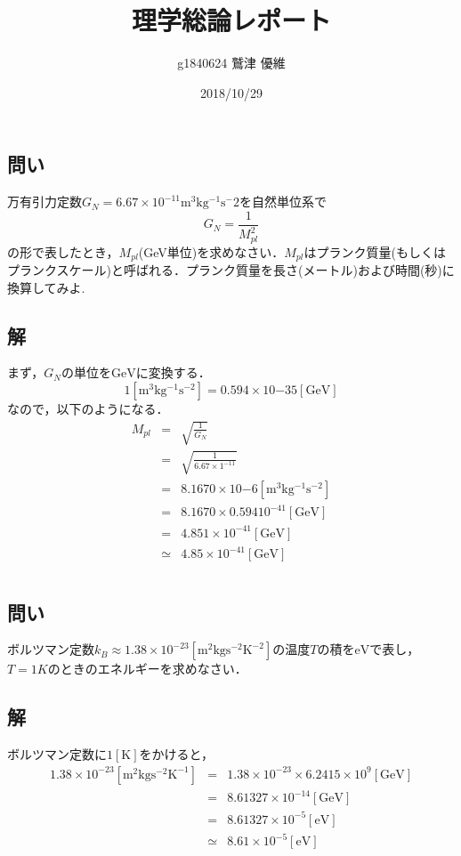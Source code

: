 \documentclass[10pt]{ujarticle}
\title{理学総論レポート}
\author{g1840624 鷲津 優維}
\date{2018/10/29}
\begin{document}
\maketitle
\section{}
\subsection{問い}
万有引力定数$G_N = 6.67×10^{-11} \mathrm{m^3 kg^{-1} s{^-2}}$を自然単位系で
\[
G_N = \frac{1}{M^2_{pl}}
\]
の形で表したとき，$M_{pl}$(GeV単位)を求めなさい．$M_{pl}$はプランク質量(もしくはプランクスケール)と呼ばれる．プランク質量を長さ(メートル)および時間(秒)に換算してみよ.

\subsection{解}
まず，$G_N$の単位を$\mathrm{GeV}$に変換する．
\[
1 \mathrm{[m^3 kg^{-1} s^{-2}]} = 0.594 ×10{-35} \mathrm{[GeV]} 
\]
なので，以下のようになる．
\begin{eqnarray*}
M_{pl} &=& \sqrt{\frac{1}{G_N}} \\
&=& \sqrt{\frac{1}{6.67 × 1^{-11}}} \\
&=& 8.1670 × 10{-6}\mathrm{[m^3 kg^{-1} s^{-2}]} \\
&=& 8.1670 × 0.594  10^{-41} \mathrm{[GeV]} \\
&=& 4.851×10^{-41}\mathrm{[GeV]} \\
&\simeq& 4.85×10^{-41}\mathrm{[GeV]}
\end{eqnarray*}


\section{}
\subsection{問い}
ボルツマン定数$k_B \approx 1.38 \times 10^{-23} \mathrm{[m^2 kg s^{-2} K^{-2}]}$の温度$T$の積を$\mathrm{eV}$で表し，$T=1K$のときのエネルギーを求めなさい．

\subsection{解}
ボルツマン定数に$1\mathrm{[K]}$をかけると，
\begin{eqnarray*}
1.38 \times 10^{-23} \mathrm{[m^2 kg s^{-2} K^{-1}]} &=& 1.38 \times 10^{-23} \times 6.2415 \times 10^9 \mathrm{[GeV]}\\
&=& 8.61327 \times 10^{-14} \mathrm{[GeV]} \\
&=& 8.61327 \times 10^{-5} \mathrm{[eV]}\\
&\simeq& 8.61 \times 10^{-5} \mathrm{[eV]}
\end{eqnarray*}
\end{document}
